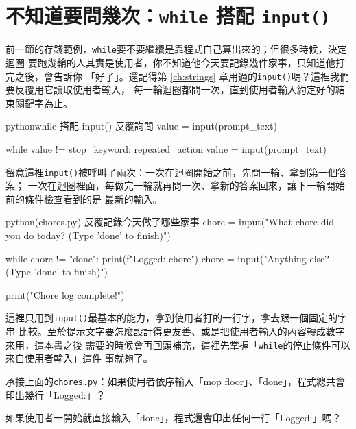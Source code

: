 \section{不知道要問幾次：\texttt{while} 搭配 \texttt{input()}}
\label{sec:while-input}

前一節的存錢範例，\texttt{while}要不要繼續是靠程式自己算出來的；但很多時候，決定迴圈
要跑幾輪的人其實是使用者，你不知道他今天要記錄幾件家事，只知道他打完之後，會告訴你
「好了」。還記得第 \ref{ch:strings} 章用過的\texttt{input()}嗎？這裡我們要反覆用它讀取使用者輸入，
每一輪迴圈都問一次，直到使用者輸入約定好的結束關鍵字為止。

\begin{code}{python}{while 搭配 input() 反覆詢問}
value = input(prompt_text)

while value != stop_keyword:
    repeated_action
    value = input(prompt_text)
\end{code}

留意這裡\texttt{input()}被呼叫了兩次：一次在迴圈開始之前，先問一輪、拿到第一個答案；
一次在迴圈裡面，每做完一輪就再問一次、拿新的答案回來，讓下一輪開始前的條件檢查看到的是
最新的輸入。

\begin{example}{python}{(chores.py) 反覆記錄今天做了哪些家事}
chore = input("What chore did you do today? (Type 'done' to finish)")

while chore != "done":
    print(f"Logged: {chore}")
    chore = input("Anything else? (Type 'done' to finish)")

print("Chore log complete!")
\end{example}


這裡只用到\texttt{input()}最基本的能力，拿到使用者打的一行字，拿去跟一個固定的字串
比較。至於提示文字要怎麼設計得更友善、或是把使用者輸入的內容轉成數字來用，這本書之後
需要的時候會再回頭補充，這裡先掌握「\texttt{while}的停止條件可以來自使用者輸入」這件
事就夠了。

\begin{drills}[label=drills:while-input]
\item 承接上面的\texttt{chores.py}：如果使用者依序輸入「mop floor」、「done」，程式總共會
印出幾行「Logged:」？
\item 如果使用者一開始就直接輸入「done」，程式還會印出任何一行「Logged:」嗎？
\end{drills}

